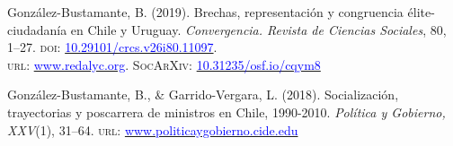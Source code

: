\begin{publications}
\begin{benumerate}{7}
\item{\small Gonz\'alez-Bustamante, B. (2019). Brechas, representación y congruencia élite-ciudadanía en Chile y Uruguay. {\itshape Convergencia. Revista de Ciencias Sociales}, 80, 1--27. {\scshape doi}: \href{https://doi.org/10.29101/crcs.v26i80.11097}{\textcolor{blue}{10.29101/crcs.v26i80.11097}}. \\ {\scshape url}: \href{https://www.redalyc.org/jatsRepo/105/10559568002/index.html}{\textcolor{blue}{www.redalyc.org}}. {\scshape \footnotesize SocArXiv}: \href{https://doi.org/10.31235/osf.io/cqym8}{\textcolor{blue}{10.31235/osf.io/cqym8}}}\vspace{1mm}

\item{\small Gonz\'alez-Bustamante, B., \& Garrido-Vergara, L. (2018). Socialización, trayectorias y poscarrera de ministros en Chile, 1990-2010. {\itshape Pol\'itica y Gobierno, XXV}(1), 31--64. {\scshape url}: \href{http://www.politicaygobierno.cide.edu/index.php/pyg/article/view/1080}{\textcolor{blue}{www.politicaygobierno.cide.edu}}}\vspace{1mm}

\end{benumerate}

\end{publications}


